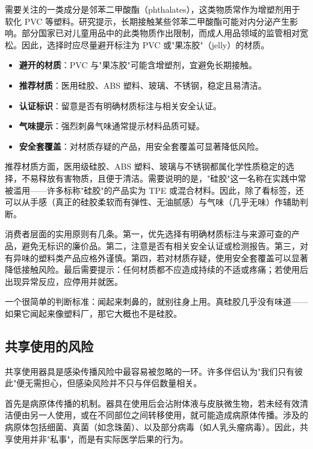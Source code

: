 \documentclass[12pt,UTF8]{ctexbook}
\newcommand{\keyword}[1]{\textbf{#1}}
\begin{document}
需要关注的一类成分是邻苯二甲酸酯（phthalates），这类物质常作为增塑剂用于软化 PVC 等塑料。研究提示，长期接触某些邻苯二甲酸酯可能对内分泌产生影响。部分国家已对儿童用品中的此类物质作出限制，而成人用品领域的监管相对宽松。因此，选择时应尽量避开标注为 PVC 或"果冻胶"（jelly）的材质。

\begin{itemize}
	\item \keyword{避开的材质}：PVC 与"果冻胶"可能含增塑剂，宜避免长期接触。
	\item \keyword{推荐材质}：医用硅胶、ABS 塑料、玻璃、不锈钢，稳定且易清洁。
	\item \keyword{认证标识}：留意是否有明确材质标注与相关安全认证。
	\item \keyword{气味提示}：强烈刺鼻气味通常提示材料品质可疑。
	\item \keyword{安全套覆盖}：对材质存疑的产品，用安全套覆盖可显著降低风险。
\end{itemize}

推荐材质方面，医用级硅胶、ABS 塑料、玻璃与不锈钢都属化学性质稳定的选择，不易释放有害物质，且便于清洁。需要说明的是，"硅胶"这一名称在实践中常被滥用——许多标称"硅胶"的产品实为 TPE 或混合材料。因此，除了看标签，还可以从手感（真正的硅胶柔软而有弹性、无油腻感）与气味（几乎无味）作辅助判断。

消费者层面的实用原则有几条。第一，优先选择有明确材质标注与来源可查的产品，避免无标识的廉价品。第二，注意是否有相关安全认证或检测报告。第三，对有异味的塑料类产品应格外谨慎。第四，若对材质存疑，使用安全套覆盖可以显著降低接触风险。最后需要提示：任何材质都不应造成持续的不适或疼痛；若使用后出现异常反应，应停用并就医。

\begin{tcolorbox}[colback=pink!5!white,colframe=red!50!black,title=贴心小叮咛]
	一个很简单的判断标准：闻起来刺鼻的，就别往身上用。真硅胶几乎没有味道——如果它闻起来像塑料厂，那它大概也不是硅胶。
\end{tcolorbox}
\subsection{共享使用的风险}

共享使用器具是感染传播风险中最容易被忽略的一环。许多伴侣认为"我们只有彼此"便无需担心，但感染风险并不只与伴侣数量相关。

首先是病原体传播的机制。器具在使用后会沾附体液与皮肤微生物，若未经有效清洁便由另一人使用，或在不同部位之间转移使用，就可能造成病原体传播。涉及的病原体包括细菌、真菌（如念珠菌）、以及部分病毒（如人乳头瘤病毒）。因此，共享使用并非"私事"，而是有实际医学后果的行为。
\end{document}

